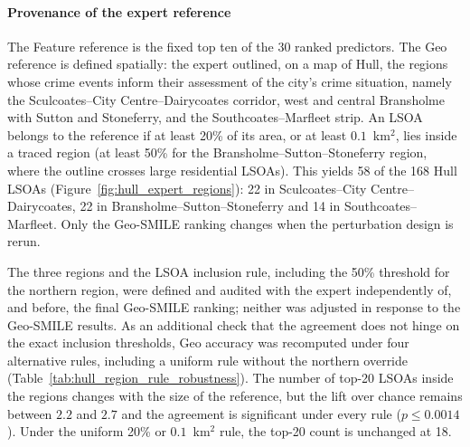 \paragraph{Provenance of the expert reference}
\label{sec:hull_ground_truth}

The Feature reference is the fixed top ten of the 30 ranked predictors. The Geo reference is defined spatially: the expert outlined, on a map of Hull, the regions whose crime events inform their assessment of the city's crime situation, namely the Sculcoates--City Centre--Dairycoates corridor, west and central Bransholme with Sutton and Stoneferry, and the Southcoates--Marfleet strip. An LSOA belongs to the reference if at least 20\% of its area, or at least $0.1$~km$^2$, lies inside a traced region (at least 50\% for the Bransholme--Sutton--Stoneferry region, where the outline crosses large residential LSOAs). This yields 58 of the 168 Hull LSOAs (Figure~\ref{fig:hull_expert_regions}): 22 in Sculcoates--City Centre--Dairycoates, 22 in Bransholme--Sutton--Stoneferry and 14 in Southcoates--Marfleet. Only the Geo-SMILE ranking changes when the perturbation design is rerun.

The three regions and the LSOA inclusion rule, including the 50\% threshold for the northern region, were defined and audited with the expert independently of, and before, the final Geo-SMILE ranking; neither was adjusted in response to the Geo-SMILE results. As an additional check that the agreement does not hinge on the exact inclusion thresholds, Geo accuracy was recomputed under four alternative rules, including a uniform rule without the northern override (Table~\ref{tab:hull_region_rule_robustness}). The number of top-20 LSOAs inside the regions changes with the size of the reference, but the lift over chance remains between $2.2$ and $2.7$ and the agreement is significant under every rule ($p\le0.0014$). Under the uniform 20\% or $0.1$~km$^2$ rule, the top-20 count is unchanged at 18.

